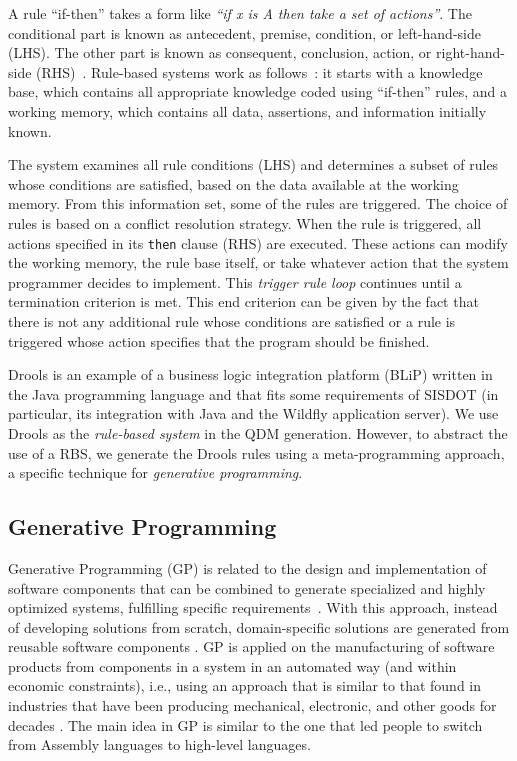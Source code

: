 \documentclass[AMA,STIX1COL,hidelinks]{WileyNJD-v2}
\begin{document}
A rule ``if-then'' takes a form like \emph{``if x is A then take a set of actions''}. The conditional part is known as antecedent, premise, condition, or left-hand-side (LHS). The other part is known as consequent, conclusion, action, or right-hand-side (RHS)~\cite{grosan2011,abraham2005}. Rule-based systems work as follows~\cite{grosan2011}: it starts with a knowledge base, which contains all appropriate knowledge coded using ``if-then'' rules, and a working memory, which contains all data, assertions, and information initially known. 

The system examines all rule conditions (LHS) and determines a subset of rules whose conditions are satisfied, based on the data available at the working memory. From this information set, some of the rules are triggered. The choice of rules is based on a conflict resolution strategy. When the rule is triggered, all actions specified in its \texttt{then} clause (RHS) are executed. These actions can modify the working memory, the rule base itself, or take whatever action that the system programmer decides to implement. This \emph{trigger rule loop} continues until a termination criterion is met. This end criterion can be given by the fact that there is not any additional rule whose conditions are satisfied or a rule is triggered whose action specifies that the program should be finished.

Drools is an example of a business logic integration platform (BLiP) written in the Java programming language and that fits some requirements of SISDOT (in particular, its integration with Java and the Wildfly application server). We use Drools as the \emph{rule-based system} in the QDM generation. However, to abstract the use of a RBS, we generate the Drools rules using a meta-programming approach, a specific technique for \emph{generative programming}. 




\subsection{Generative Programming}
\label{sec:gp}

Generative Programming (GP) is related to the design and implementation of software components that can be combined to generate specialized and highly optimized systems, fulfilling specific requirements~\cite{DBLP:phd/dnb/Czarnecki99}. With this approach, instead of developing solutions from scratch, domain-specific solutions are generated from reusable software components \cite{arora2009}. GP is applied on the manufacturing of software products from components in a system in an automated way (and within economic constraints), i.e., using an approach that is similar to that found in industries that have been producing mechanical, electronic, and other goods for decades \cite{barth2002}. The main idea in GP is similar to the one that led people to switch from Assembly languages to high-level languages. 
\end{document}
